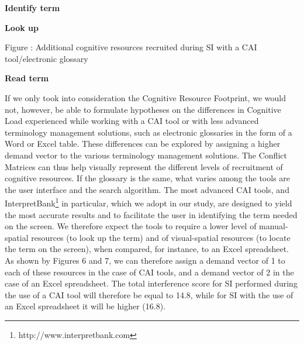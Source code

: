 \documentclass[output=paper]{langsci/langscibook}
\begin{document}
\begin{styleFramecontents}
\textbf{Identify term}
\end{styleFramecontents}

\begin{styleFramecontents}
\textbf{Look up}
\end{styleFramecontents}

 
\bfseries

\begin{styleFramecontents}
\label{bkm:Ref379390775}Figure : Additional cognitive resources recruited during SI with a CAI tool/electronic glossary
\end{styleFramecontents}

\begin{styleFramecontents}
\textbf{Read term}
\end{styleFramecontents}

If we only took into consideration the Cognitive Resource Footprint, we would not, however, be able to formulate hypotheses on the differences in Cognitive Load experienced while working with a CAI tool or with less advanced terminology management solutions, such as electronic glossaries in the form of a Word or Excel table. These differences can be explored by assigning a higher demand vector to the various terminology management solutions. The Conflict Matrices can thus help visually represent the different levels of recruitment of cognitive resources. If the glossary is the same, what varies among the tools are the user interface and the search algorithm. The most advanced CAI tools, and InterpretBank\footnote{http://www.interpretbank.com} in particular, which we adopt in our study, are designed to yield the most accurate results and to facilitate the user in identifying the term needed on the screen. We therefore expect the tools to require a lower level of manual-spatial resources (to look up the term) and of visual-spatial resources (to locate the term on the screen), when compared, for instance, to an Excel spreadsheet. As shown by Figures 6 and 7, we can therefore assign a demand vector of 1 to each of these resources in the case of CAI tools, and a demand vector of 2 in the case of an Excel spreadsheet. The total interference score for SI performed during the use of a CAI tool will therefore be equal to 14.8, while for SI with the use of an Excel spreadsheet it will be higher (16.8).
\end{document}
